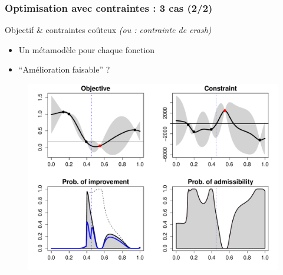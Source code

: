 \begin{frame}
\frametitle{Optimisation avec contraintes : 3 cas (2/2)}

\begin{block}{Objectif \& contraintes coûteux \textit{(ou : contrainte de crash)}}
\begin{itemize}
 \item Un métamodèle pour chaque fonction
 \item ``Amélioration faisable'' ?
\end{itemize}
\end{block}

\begin{figure}[h!]
  \centering	
  \includegraphics[trim= 0mm 0mm 0mm 0mm, clip, width=.56\textwidth]{fig/cst1Dillus.pdf}
\end{figure}
\end{frame}
